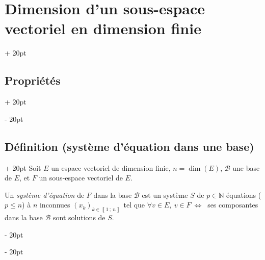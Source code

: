 \documentclass[a4paper, 12pt, twoside]{article}
\newcommand{\N}{\mathbb{N}} %
\newcommand{\nset}[2]{\left\llbracket #1\ ;\ #2 \right\rrbracket}
\newcommand{\ssi}{\ \Leftrightarrow \ }
\renewcommand{\le}{\leqslant}
\newcommand{\ind}[1][20pt]{\advance\leftskip + #1}
\newcommand{\deind}[1][20pt]{\advance\leftskip - #1}
\newenvironment{indt}[2][20pt]{#2 \par \ind[#1]}{\par \deind} %
\begin{document}
\begin{indt}{\section{Dimension d'un sous-espace vectoriel en dimension finie}}
\begin{indt}{\subsection{Propriétés}}
        \end{indt}
        
        \vspace{12pt}
        
        \begin{indt}{\subsection{Définition (système d'équation dans une base)}}
            Soit $E$ un espace vectoriel de dimension finie, $n = \dim(E)$, $\mathcal B$ une base de $E$, et $F$ un sous-espace vectoriel de $E$.
            
            Un \textit{système d'équation} de $F$ dans la base $\mathcal B$ est un système $S$ de $p \in \N$ équations ($p \le n$) à $n$ inconnues $(x_k)_{k \in \nset 1 n}$ tel que $\forall v \in E,\ v \in F \ssi$ ses composantes dans la base $\mathcal B$ sont solutions de $S$.
        \end{indt}
        
    \end{indt}
    
    \vspace{12pt}
    
\end{document}
